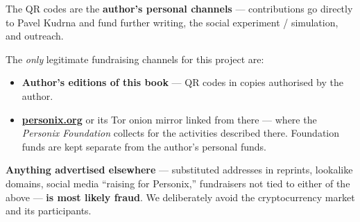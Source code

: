 \begin{minipage}[t]{0.60\textwidth}
\vspace{0pt}
\begin{mdframed}[
  linewidth=0.7pt,roundcorner=5pt,
  innerleftmargin=10pt,innerrightmargin=10pt,
  innertopmargin=8pt,innerbottommargin=8pt,
  skipabove=0pt,skipbelow=0pt,
  linecolor=cbwarning!50,backgroundcolor=cbwarning!5,
  nobreak=true,
  needspace=4\baselineskip,
]
\footnotesize
The QR codes are the \textbf{author's personal channels} --- contributions go directly to Pavel Kudrna and fund further writing, the social experiment / simulation, and outreach.

\smallskip
The \emph{only} legitimate fundraising channels for this project are:

\smallskip
\begin{itemize}
\setlength{\itemsep}{0pt}
\setlength{\topsep}{0pt}
\item \textbf{Author's editions of this book} --- QR codes in copies authorised by the author.
\item \href{https://personix.org}{\textbf{personix.org}} or its Tor onion mirror linked from there --- where the \emph{Personix Foundation} collects for the activities described there. Foundation funds are kept separate from the author's personal funds.
\end{itemize}

\smallskip
\textbf{Anything advertised elsewhere} --- substituted addresses in reprints, lookalike domains, social media ``raising for Personix,'' fundraisers not tied to either of the above --- \textbf{is most likely fraud}. We deliberately avoid the cryptocurrency market and its participants.
\end{mdframed}
\end{minipage}

\clearpage
